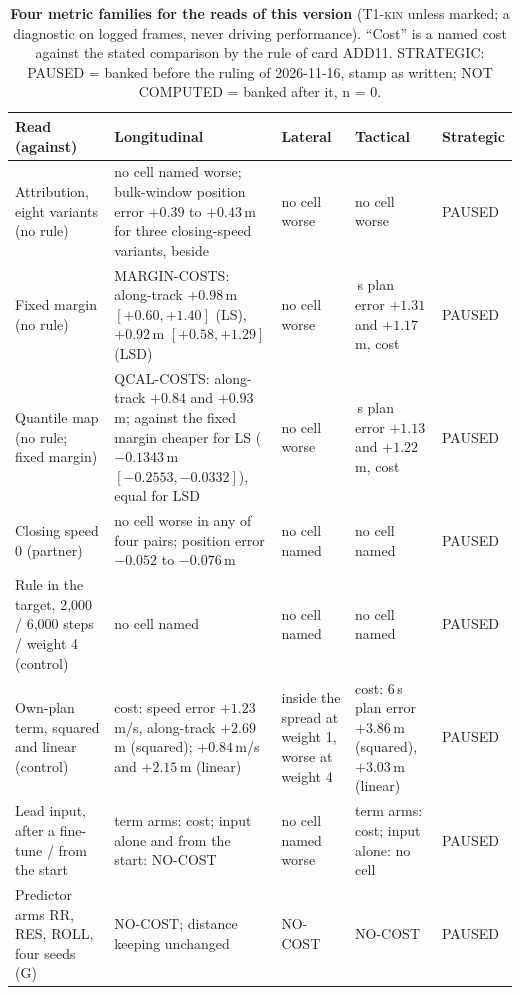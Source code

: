 \documentclass[10pt,twocolumn]{article}
\theoremstyle{remark}
\newcommand{\tier}[1]{\textsc{\small #1}}
\begin{document}
\begin{table}[!tp]
\centering
\caption{\textbf{Four metric families for the reads of this version} (\tier{T1-kin} unless marked; a diagnostic on logged frames, never driving performance). ``Cost'' is a named cost against the stated comparison by the rule of card ADD11. STRATEGIC: PAUSED = banked before the ruling of 2026-11-16, stamp as written; NOT COMPUTED = banked after it, n = 0.}
\label{tab:fam7}
\scriptsize
\begin{tabularx}{\textwidth}{@{}>{\raggedright\arraybackslash}p{33mm}>{\raggedright\arraybackslash}X>{\raggedright\arraybackslash}X>{\raggedright\arraybackslash}X>{\raggedright\arraybackslash}p{19mm}@{}}
\toprule
Read (against) & Longitudinal & Lateral & Tactical & Strategic \\
\midrule
Attribution, eight variants (no rule) & no cell named worse; bulk-window position error $+0.39$ to $+0.43$\,m for three closing-speed variants, beside & no cell worse & no cell worse & PAUSED \\
Fixed margin (no rule) & MARGIN-COSTS: along-track $+0.98$\,m $[+0.60,+1.40]$ (LS), $+0.92$\,m $[+0.58,+1.29]$ (LSD) & no cell worse & 6\,s plan error $+1.31$ and $+1.17$\,m, cost & PAUSED \\
Quantile map (no rule; fixed margin) & QCAL-COSTS: along-track $+0.84$ and $+0.93$\,m; against the fixed margin cheaper for LS ($-0.1343$\,m $[-0.2553,-0.0332]$), equal for LSD & no cell worse & 6\,s plan error $+1.13$ and $+1.22$\,m, cost & PAUSED \\
Closing speed 0 (partner) & no cell worse in any of four pairs; position error $-0.052$ to $-0.076$\,m & no cell named & no cell named & PAUSED \\
Rule in the target, 2,000 / 6,000 steps / weight 4 (control) & no cell named & no cell named & no cell named & PAUSED \\
Own-plan term, squared and linear (control) & cost: speed error $+1.23$\,m/s, along-track $+2.69$\,m (squared); $+0.84$\,m/s and $+2.15$\,m (linear) & inside the spread at weight 1, worse at weight 4 & cost: 6\,s plan error $+3.86$\,m (squared), $+3.03$\,m (linear) & PAUSED \\
Lead input, after a fine-tune / from the start & term arms: cost; input alone and from the start: NO-COST & no cell named worse & term arms: cost; input alone: no cell & PAUSED \\
Predictor arms RR, RES, ROLL, four seeds (G) & NO-COST; distance keeping unchanged & NO-COST & NO-COST & PAUSED \\

\end{tabularx}
\end{table}
\end{document}
